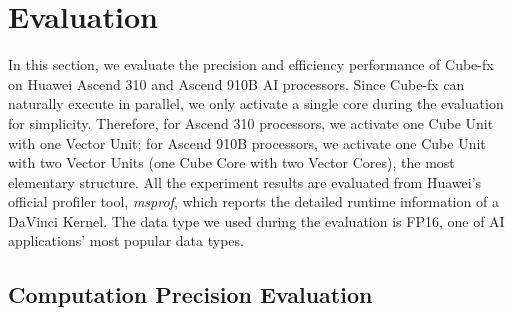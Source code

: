\section{Evaluation \label{sec:5}}

In this section, we evaluate the precision and efficiency performance of Cube-fx on Huawei Ascend 310 and Ascend 910B AI processors. Since Cube-fx can naturally execute in parallel, we only activate a single core during the evaluation for simplicity. Therefore, for Ascend 310 processors, we activate one Cube Unit with one Vector Unit; for Ascend 910B processors, we activate one Cube Unit with two Vector Units (one Cube Core with two Vector Cores), the most elementary structure. All the experiment results are evaluated from Huawei's official profiler tool, \textit{msprof}, which reports the detailed runtime information of a DaVinci Kernel. The data type we used during the evaluation is FP16, one of AI applications' most popular data types.

\subsection{Computation Precision Evaluation \label{Sec: 4.1}}

